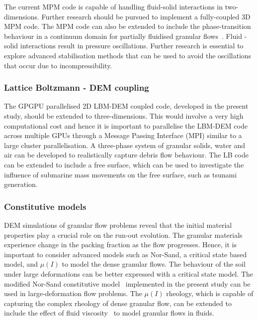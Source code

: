 The current MPM code is capable of handling fluid-solid interactions in 
two-dimensions. Further research should be pursued to implement a fully-coupled 
3D MPM code. The MPM code can also be extended to include the 
phase-transition behaviour in a continuum domain for partially fluidised 
granular flows~\citep{Aranson2002, Aranson2001, Volfson2003}. Fluid - solid 
interactions result in pressure oscillations. Further research is essential to 
explore advanced stabilisation methods that can be used to avoid the 
oscillations that occur due to incompressibility.

\subsubsection*{Lattice Boltzmann - DEM coupling}

The GPGPU parallelised 2D LBM-DEM coupled code, developed in the present study, 
should be extended to three-dimensions. This would involve a very high 
computational cost and hence it is important to parallelise the LBM-DEM code 
across multiple GPUs through a Message Passing Interface (MPI) similar to a 
large cluster parallelisation. A three-phase system of granular solids, water 
and air can be developed to realistically capture debris flow behaviour. The LB 
code can be extended to include a free surface, which can be used to 
investigate the influence of submarine mass movements on the free surface, such 
as tsunami generation.

\subsubsection*{Constitutive models}

DEM simulations of granular flow problems reveal that the initial material 
properties play a crucial role on the run-out evolution. The granular materials 
experience change in the packing fraction as the flow progresses. Hence, it is 
important to consider advanced models such as Nor-Sand, a critical state based 
model, and $\mu(I)$  to model the dense granular flows. The behaviour of the 
soil under large deformations can be better expressed with a critical state 
model. The modified Nor-Sand constitutive model~\citep{Robert2010} implemented 
in the present study can be used in large-deformation flow problems. The 
$\mu(I)$ rheology, which is capable of capturing the complex rheology of dense 
granular flow, can be extended to include the effect of fluid 
viscosity~\citep{Pouliquen2005} to model granular flows in fluids. 


